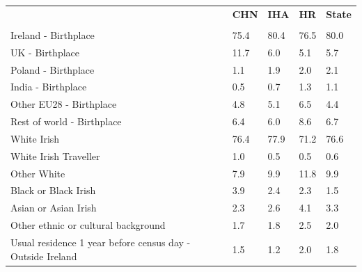 \documentclass{article}
\begin{document}
\pagebreak
\begin{table}[h]	
\centering
		\begin{tabular}{KTTTT}
  \hline
& \textbf{CHN} & \textbf{IHA} & \textbf{HR}& \textbf{State}\\ 
  \hline
    \\ 
    \hline
Ireland - Birthplace & 75.4& 80.4& 76.5& 80.0\\
UK - Birthplace & 11.7&  6.0&  5.1&  5.7\\
Poland - Birthplace & 1.1& 1.9& 2.0& 2.1\\
India - Birthplace & 0.5& 0.7& 1.3& 1.1\\
Other EU28 - Birthplace & 4.8& 5.1& 6.5& 4.4\\
Rest of world - Birthplace & 6.4& 6.0& 8.6& 6.7\\
    \hline
White Irish & 76.4& 77.9& 71.2& 76.6\\
White Irish Traveller & 1.0& 0.5& 0.5& 0.6\\
Other White &  7.9&  9.9& 11.8&  9.9\\
Black or Black Irish & 3.9& 2.4& 2.3& 1.5\\
Asian or Asian Irish & 2.3& 2.6& 4.1& 3.3\\
Other ethnic or cultural background & 1.7& 1.8& 2.5& 2.0\\
    \hline
Usual residence 1 year before census day - Outside Ireland & 1.5& 1.2& 2.0& 1.8\\


\end{tabular}
\end{table}
\end{document}
